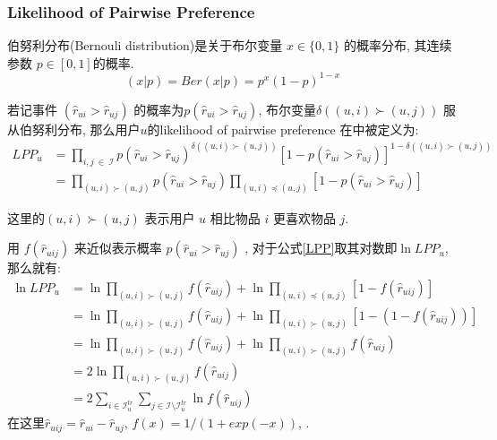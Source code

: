\subsubsection{Likelihood of Pairwise Preference}

伯努利分布(Bernouli distribution)是关于布尔变量 $x \in \{0,1\}$ 的概率分布, 其连续参数 $p \in \left[0,1\right]$的概率.
\begin{equation}
\left( x|p \right) = Ber\left(x|p \right)=p^x\left(1-p \right)^{1-x}
\end{equation}

若记事件 $\left(\hat{r}_{ui} > \hat{r}_{uj}\right)$ 的概率为$p\left(\hat{r}_{ui} > \hat{r}_{uj}\right)$, 布尔变量$\delta\left(\left(u,i\right) \succ \left(u,j\right)\right)$ 服从伯努利分布, 那么用户$u$的likelihood of pairwise preference 在\cite{rendle2009bpr}中被定义为:
\begin{equation}
\label{LPP}
\begin{aligned}
LPP_u  
&= \prod_{i,j \ \in \  \mathcal{I}}p\left(\hat{r}_{ui} > \hat{r}_{uj}\right)^{\delta\left(\left(u,i\right) \succ \left(u,j\right)\right)} \left[1-p\left(\hat{r}_{ui} > \hat{r}_{uj}\right)\right]^{1-\delta\left(\left(u,i\right) \succ \left(u,j\right)\right)}\\
&= \prod_{\left(u,i\right) \succ \left(u,j\right)}p\left(\hat{r}_{ui} > \hat{r}_{uj}\right)\prod_{\left(u,i\right) \preceq \left(u,j\right)}\left[1-p\left(\hat{r}_{ui} > \hat{r}_{uj}\right)\right]
\end{aligned}
\end{equation}

这里的$\left(u,i\right) \succ \left(u,j\right)$ 表示用户 $u$ 相比物品 $i$ 更喜欢物品 $j$.

用 $f \left(\hat{r}_{uij} \right)$ 来近似表示概率
$p\left(\hat{r}_{ui} > \hat{r}_{uj}\right)$ \cite{rendle2009bpr}, 对于公式\ref{LPP}取其对数即$\ln LPP_u$, 那么就有:
\begin{equation}
\label{eq5}
\begin{aligned}
\ln LPP_u
&= \ln \prod_{\left(u,i\right) \succ \left(u,j\right)} f \left(\hat{r}_{uij}\right) + \ln \prod_{\left(u,i\right) \preceq \left(u,j\right)}\left[1- f \left(\hat{r}_{uij}\right)\right]\\
&= \ln \prod_{\left(u,i\right) \succ \left(u,j\right)} f \left(\hat{r}_{uij}\right) + \ln \prod_{\left(u,i\right) \succ \left(u,j\right)}\left[1-\left(1- f \left(\hat{r}_{uij}\right)\right)\right]\\
&= \ln \prod_{\left(u,i\right) \succ \left(u,j\right)} f \left(\hat{r}_{uij}\right) + \ln \prod_{\left(u,i\right) \succ \left(u,j\right)} f \left(\hat{r}_{uij}\right)\\
&= 2\ln \prod_{\left(u,i\right) \succ \left(u,j\right)} f \left(\hat{r}_{uij}\right)\\
&= 2 \sum_{i\in\mathcal{I}_u^{tr}}
\sum_{j \in \mathcal{I}\setminus \mathcal{I}_u^{tr}}\ln f \left(\hat{r}_{uij}\right)
\end{aligned}
\end{equation}
在这里$\hat{r}_{uij} = \hat{r}_{ui} - \hat{r}_{uj}$, $f \left(x\right) = 1/\left(1+exp\left(-x\right)\right)$, .

